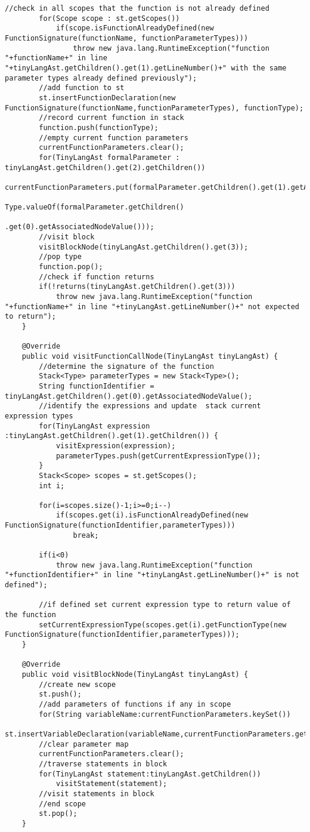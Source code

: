\begin{lstlisting}[basicstyle=\miniscule,caption=Semantic Analyser,label=listing:semanticanalyser]
		//check in all scopes that the function is not already defined
		for(Scope scope : st.getScopes())
			if(scope.isFunctionAlreadyDefined(new FunctionSignature(functionName, functionParameterTypes))) 
				throw new java.lang.RuntimeException("function "+functionName+" in line "+tinyLangAst.getChildren().get(1).getLineNumber()+" with the same parameter types already defined previously");
		//add function to st
		st.insertFunctionDeclaration(new FunctionSignature(functionName,functionParameterTypes), functionType);
		//record current function in stack
		function.push(functionType);
		//empty current function parameters
		currentFunctionParameters.clear();
		for(TinyLangAst formalParameter : tinyLangAst.getChildren().get(2).getChildren()) 
			currentFunctionParameters.put(formalParameter.getChildren().get(1).getAssociatedNodeValue(),
											Type.valueOf(formalParameter.getChildren()
											.get(0).getAssociatedNodeValue()));
		//visit block
		visitBlockNode(tinyLangAst.getChildren().get(3));
		//pop type
		function.pop();
		//check if function returns
		if(!returns(tinyLangAst.getChildren().get(3)))
			throw new java.lang.RuntimeException("function "+functionName+" in line "+tinyLangAst.getLineNumber()+" not expected to return");
	}

	@Override
	public void visitFunctionCallNode(TinyLangAst tinyLangAst) {
		//determine the signature of the function
		Stack<Type> parameterTypes = new Stack<Type>();
		String functionIdentifier = tinyLangAst.getChildren().get(0).getAssociatedNodeValue();
		//identify the expressions and update  stack current expression types
		for(TinyLangAst expression :tinyLangAst.getChildren().get(1).getChildren()) {
			visitExpression(expression);
			parameterTypes.push(getCurrentExpressionType());
		}
		Stack<Scope> scopes = st.getScopes();
		int i;

		for(i=scopes.size()-1;i>=0;i--)
			if(scopes.get(i).isFunctionAlreadyDefined(new FunctionSignature(functionIdentifier,parameterTypes)))
				break;
		
		if(i<0)
			throw new java.lang.RuntimeException("function "+functionIdentifier+" in line "+tinyLangAst.getLineNumber()+" is not defined");
		
		//if defined set current expression type to return value of the function
		setCurrentExpressionType(scopes.get(i).getFunctionType(new FunctionSignature(functionIdentifier,parameterTypes)));
	}

	@Override
	public void visitBlockNode(TinyLangAst tinyLangAst) {
		//create new scope 
		st.push();
		//add parameters of functions if any in scope
		for(String variableName:currentFunctionParameters.keySet()) 
			st.insertVariableDeclaration(variableName,currentFunctionParameters.get(variableName));
		//clear parameter map
		currentFunctionParameters.clear();
		//traverse statements in block
		for(TinyLangAst statement:tinyLangAst.getChildren())
			visitStatement(statement);
		//visit statements in block
		//end scope
		st.pop();
	}


\end{lstlisting}

